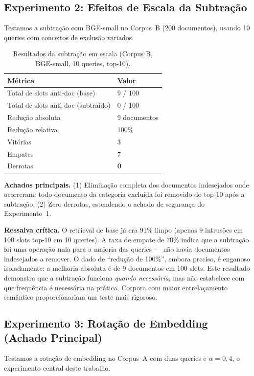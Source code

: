 \documentclass{article}
\begin{document}
\subsection{Experimento 2: Efeitos de Escala da Subtração}

Testamos a subtração com BGE-small no Corpus~B (200 documentos), usando 10 queries com conceitos de exclusão variados.

\begin{table}[ht]
\centering
\caption{Resultados da subtração em escala (Corpus B, BGE-small, 10 queries, top-10).}
\label{tab:exp2}
\begin{tabular}{ll}
\toprule
Métrica & Valor \\
\midrule
Total de slots anti-doc (base) & 9 / 100 \\
Total de slots anti-doc (subtraído) & 0 / 100 \\
Redução absoluta & 9 documentos \\
Redução relativa & 100\% \\
Vitórias & 3 \\
Empates & 7 \\
Derrotas & \textbf{0} \\
\bottomrule
\end{tabular}
\end{table}

\textbf{Achados principais.} (1) Eliminação completa dos documentos indesejados onde ocorreram: todo documento da categoria excluída foi removido do top-10 após a subtração. (2) Zero derrotas, estendendo o achado de segurança do Experimento~1.

\textbf{Ressalva crítica.} O retrieval de base já era 91\% limpo (apenas 9 intrusões em 100 slots top-10 em 10 queries). A taxa de empate de 70\% indica que a subtração foi uma operação nula para a maioria das queries --- não havia documentos indesejados a remover. O dado de ``redução de 100\%'', embora preciso, é enganoso isoladamente: a melhoria absoluta é de 9 documentos em 100 slots. Este resultado demonstra que a subtração funciona \emph{quando necessária}, mas não estabelece com que frequência é necessária na prática. Corpora com maior entrelaçamento semântico proporcionariam um teste mais rigoroso.

\subsection{Experimento 3: Rotação de Embedding (Achado Principal)}

Testamos a rotação de embedding no Corpus~A com duas queries e $\alpha = 0{,}4$, o experimento central deste trabalho.
\end{document}

